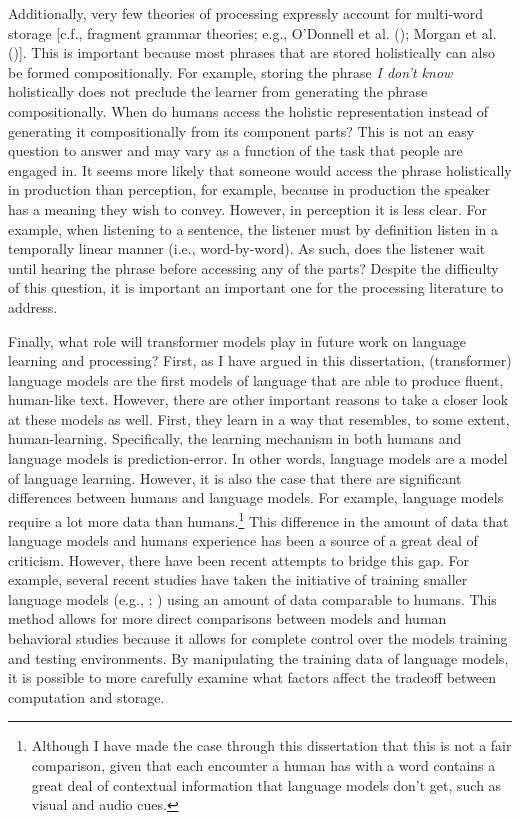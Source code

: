 \documentclass[
  12pt,
  letterpaper,
]{scrreprt}
\begin{document}
Additionally, very few theories of processing expressly account for
multi-word storage {[}c.f., fragment grammar theories; e.g., O'Donnell
et al. ();
Morgan et al.
(){]}. This is
important because most phrases that are stored holistically can also be
formed compositionally. For example, storing the phrase \emph{I don't
know} holistically does not preclude the learner from generating the
phrase compositionally. When do humans access the holistic
representation instead of generating it compositionally from its
component parts? This is not an easy question to answer and may vary as
a function of the task that people are engaged in. It seems more likely
that someone would access the phrase holistically in production than
perception, for example, because in production the speaker has a meaning
they wish to convey. However, in perception it is less clear. For
example, when listening to a sentence, the listener must by definition
listen in a temporally linear manner (i.e., word-by-word). As such, does
the listener wait until hearing the phrase before accessing any of the
parts? Despite the difficulty of this question, it is important an
important one for the processing literature to address.

Finally, what role will transformer models play in future work on
language learning and processing? First, as I have argued in this
dissertation, (transformer) language models are the first models of
language that are able to produce fluent, human-like text. However,
there are other important reasons to take a closer look at these models
as well. First, they learn in a way that resembles, to some extent,
human-learning. Specifically, the learning mechanism in both humans and
language models is prediction-error. In other words, language models are
a model of language learning. However, it is also the case that there
are significant differences between humans and language models. For
example, language models require a lot more data than humans.\footnote{Although
  I have made the case through this dissertation that this is not a fair
  comparison, given that each encounter a human has with a word contains
  a great deal of contextual information that language models don't get,
  such as visual and audio cues.} This difference in the amount of data
that language models and humans experience has been a source of a great
deal of criticism. However, there have been recent attempts to bridge
this gap. For example, several recent studies have taken the initiative
of training smaller language models (e.g.,
;
) using an
amount of data comparable to humans. This method allows for more direct
comparisons between models and human behavioral studies because it
allows for complete control over the models training and testing
environments. By manipulating the training data of language models, it
is possible to more carefully examine what factors affect the tradeoff
between computation and storage.
\end{document}
